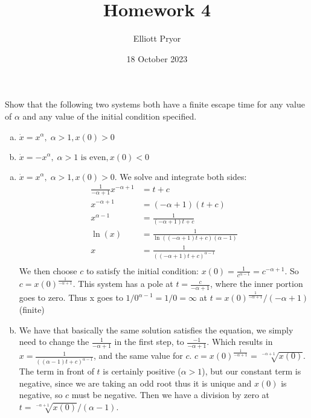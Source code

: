 \documentclass[11pt]{article}
\title{Homework 4}
\author{Elliott Pryor}
\date{18 October 2023}
\begin{document}
\maketitle

Show that the following two systems both have a finite escape time for any
value of $\alpha$ and any value of the initial condition specified.

\begin{enumerate}[(a)]
    \item $\dot{x} = x^\alpha, \; \alpha > 1, x(0) > 0$
    \item $\dot{x} = -x^\alpha, \; \alpha > 1 \text{ is even}, x(0) < 0$
\end{enumerate}

\soln

\begin{enumerate}[(a)]
    \item $\dot{x} = x^\alpha, \; \alpha > 1, x(0) > 0$. 
    We solve and integrate both sides:
    \begin{align*}
         \frac{1}{-\alpha + 1}x^{-\alpha + 1} &= t + c\\
         x^{-\alpha + 1} &= (-\alpha + 1)(t+c)\\
         x^{\alpha - 1} &= \frac{1}{(-\alpha + 1)t + c}\\
         \ln(x) &= \frac{1}{\ln((-\alpha + 1)t + c) (\alpha - 1)}\\
         x &= \frac{1}{((-\alpha + 1)t + c)^{\alpha - 1}}\\
    \end{align*}
    We then choose $c$ to satisfy the initial condition: $x(0) = \frac{1}{c^{\alpha - 1}} = c^{-\alpha + 1}$.
    So $c = x(0)^{\frac{1}{-\alpha + 1}}$.
    This system has a pole at $t = \frac{c}{-\alpha + 1}$, where the inner portion goes to zero.
    Thus x goes to $1/0^{\alpha - 1} = 1/0 = \infty$ at $t = x(0)^{\frac{1}{-\alpha + 1}}/(-\alpha + 1)$ (finite)

    \item We have that basically the same solution satisfies the equation,
    we simply need to change the $\frac{1}{-\alpha + 1}$ in the first step, to $\frac{-1}{-\alpha + 1}$.
    Which results in $x = \frac{1}{((\alpha - 1)t + c)^{\alpha - 1}}$, and the same value for $c$.
    $c = x(0)^{\frac{1}{-\alpha + 1}} = \sqrt[-\alpha + 1]{x(0)}$. 
    The term in front of $t$ is certainly positive ($\alpha > 1$), but our constant term is negative, since we are taking an odd root 
    thus it is unique and $x(0)$ is negative, so $c$ must be negative. 
    Then we have a division by zero at $t = \sqrt[-\alpha + 1]{x(0)}/(\alpha - 1)$.
\end{enumerate}
\end{document}
